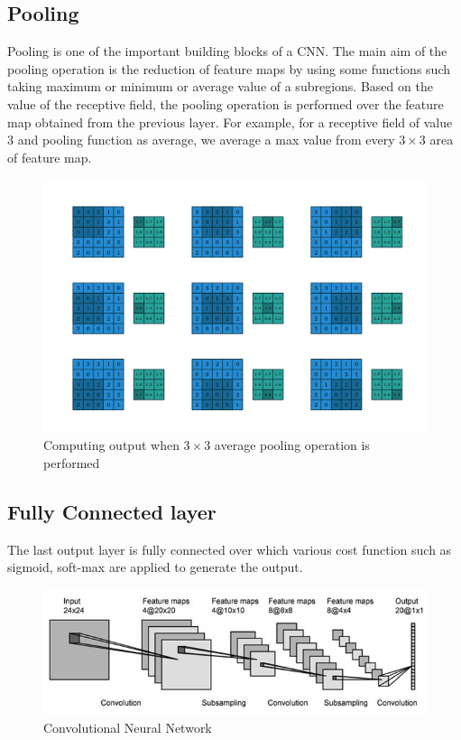 \subsection{Pooling}
Pooling is one of the important building blocks of a CNN. The main aim of the pooling operation is the reduction of feature maps by using some functions such taking maximum or minimum or average value of a subregions. Based on the value of the receptive field, the pooling operation is performed over the feature map obtained from the previous layer. For example, for a receptive field of value 3 and pooling function as average, we average a max value from every $3 \times 3$ area of feature map.

\begin{figure}[H]
  \centering
    \includegraphics[scale=.3, angle=0]{Files/Pooling.png}
    \caption[Pooling Operation]{Computing output when $3 \times 3$ average pooling operation is performed \cite{1603.07285}}
    \label{fig:Pooling}
\end{figure}

\subsection{Fully Connected layer}
The last output layer is fully connected  over which various cost function such as sigmoid, soft-max are applied to generate the output.


\begin{figure}[H]
  \centering
    \includegraphics[scale=.6, angle=0]{Files/cnn-2.png}
    \caption[Convolutional Neural Network]{Convolutional Neural Network}
    \label{fig:CNN}
\end{figure}